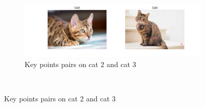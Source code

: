 \documentclass[12pt]{article}
\begin{document}
\begin{figure}[H]
\begin{subfigure}{\textwidth}
				\label{fig:cat3maxcat2}
			\end{subfigure}
		\\
		\hfill
		\begin{subfigure}{\textwidth}
			\centering
			\includegraphics[width=\textwidth]{i22.png}
			\caption{Key points pairs on cat 2 and cat 3}
			\label{fig:cat3cat2}
		\end{subfigure}
	\\\end{figure}
\end{document}
